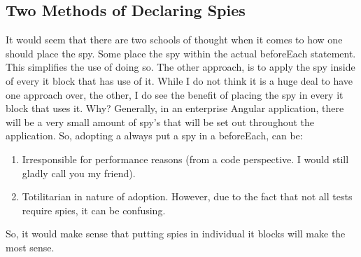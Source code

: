 \subsection{ Two Methods of Declaring Spies }
It would seem that there are two schools of thought when it comes to how one should
place the spy. Some place the spy within the actual beforeEach statement. This
simplifies the use of doing so. The other approach, is to apply the spy inside of
every it block that has use of it. While I do not think it is a huge deal to have
one approach over, the other, I do see the benefit of placing the spy in every
it block that uses it. Why? Generally, in an enterprise Angular application,
there will be a very small amount of spy's that will be set out throughout the
application. So, adopting a always put a spy in a beforeEach, can be:
\begin{enumerate}
  \item Irresponsible for performance reasons (from a code perspective. I would still gladly call you my friend).
  \item Totilitarian in nature of adoption. However, due to the fact that not
  all tests require spies, it can be confusing.
\end{enumerate}

So, it would make sense that putting spies in individual it blocks will make the
most sense. 
